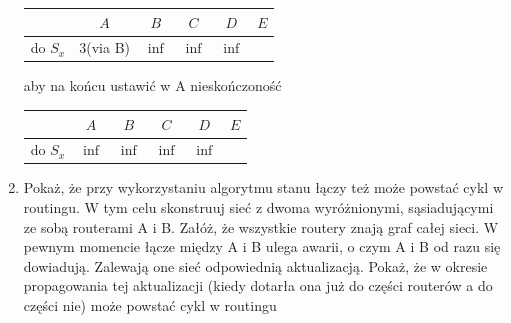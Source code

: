 \documentclass{article}[A4]
\begin{document}
\begin{enumerate}
\begin{center}
\begin{tabular}{c||c|c|c|c|c|}
	  &$A$&$B$&$C$&$D$&$E$\\
	 \hline \hline
	 do $S_x$&3(via B)&$\inf$&$\inf$&$\inf$&\\ 
	 \hline \hline
\end{tabular}
\end{center} 
aby na końcu ustawić w A nieskończoność
\begin{center}
\begin{tabular}{c||c|c|c|c|c|} 
	  &$A$&$B$&$C$&$D$&$E$\\
	 \hline \hline
	 do $S_x$&$\inf$&$\inf$&$\inf$&$\inf$&\\ 
	 \hline \hline
\end{tabular}
\end{center} 
\item{Pokaż, że przy wykorzystaniu algorytmu stanu łączy też może powstać cykl w routingu. W tym celu skonstruuj sieć z dwoma wyróżnionymi, sąsiadującymi ze sobą routerami A i B. Załóż, że wszystkie routery znają graf całej sieci. W pewnym momencie łącze między A i B ulega awarii, o czym A i B od razu się dowiadują. Zalewają one sieć odpowiednią aktualizacją. Pokaż, że w okresie propagowania tej aktualizacji (kiedy dotarła ona już do części routerów a do części nie) może powstać cykl w routingu}\\

\end{enumerate}

 
\end{document}
